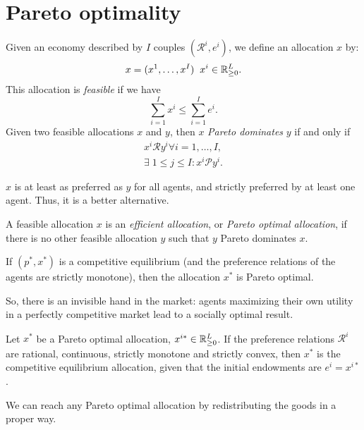 \documentclass[twoside, titlepage]{article}
\begin{document}

\section{Pareto optimality}
Given an economy described by $I$ couples $(\mathcal{R}^i, e^i)$, we define an allocation $x$ by:
\[
    x = (x^1, \dots, x^I) \;\; x^i \in \mathbb{R}_{\geq0}^L.
\]
This allocation is \textit{feasible} if we have
\[
    \sum^I_{i=1}x^i \leq \sum^I_{i=1}e^i.
\]
Given two feasible allocations $x$ and $y$, then $x$ \textit{Pareto dominates} $y$ if and only if
\begin{align*}
    x^i \mathcal{R} y^i \forall i = 1, \dots, I, \\
    \exists\; 1 \leq j \leq I : x^i \mathcal{P} y^i.
\end{align*}
\begin{explanation}
    $x$ is at least as preferred as $y$ for all agents, and strictly preferred by at least one agent. Thus, it is a better alternative.
\end{explanation}

A feasible allocation $x$ is an \textit{efficient allocation}, or \textit{Pareto optimal allocation}, if there is no other feasible allocation $y$ such that $y$ Pareto dominates $x$.

\begin{theorem}
    If $(p^*, x^*)$ is a competitive equilibrium (and the preference relations of the agents are strictly monotone), then the allocation $x^*$ is Pareto optimal.
    \begin{explanation}
        So, there is an invisible hand in the market: agents maximizing their own utility in a perfectly competitive market lead to a socially optimal result.
    \end{explanation}
\end{theorem}

\begin{theorem}
    Let $x^*$ be a Pareto optimal allocation, $x^{i*} \in \mathbb{R}_{\geq0}^L$. If the preference relations $\mathcal{R}^i$ are rational, continuous, strictly monotone and strictly convex, then $x^*$ is the competitive equilibrium allocation, given that the initial endowments are $e^i = x^{i*}$.
    \begin{explanation}
        We can reach any Pareto optimal allocation by redistributing the goods in a proper way.
    \end{explanation}
\end{theorem}
\end{document}
